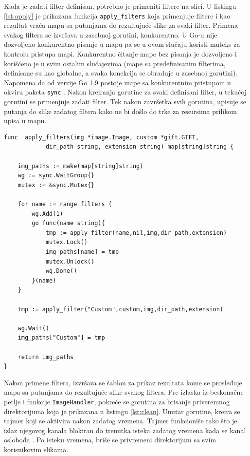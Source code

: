 \documentclass[12pt,oneside]{memoir}
\begin{document}
Kada je zadati filter definisan, potrebno je primeniti filtere na slici. U listingu \ref{lst:apply} je prikazana funkcija  \texttt{apply\_filters} koja primenjuje filtere i kao rezultat vraća mapu sa putanjama do rezultujuće slike za svaki filter. Primena svakog filtera se izvršava u zasebnoj gorutini, konkurentno. U Go-u nije dozvoljeno konkurentno pisanje u mapu pa se u ovom slučaju koristi muteks za kontrolu pristupa mapi. Konkurentno čitanje mape bez pisanja je dozvoljeno i korišćeno je u svim ostalim slučajevima (mape sa predefinisanim filterima, definisane su kao globalne, a svaka konekcija se obrađuje u zasebnoj gorutini). Napomena da od verzije Go 1.9 postoje mape sa konkurentnim pristupom u okviru paketa \texttt{sync} \cite{sync}. Nakon kreiranja gorutine za svaki definisani filter, u tekućoj gorutini se primenjuje zadati filter. Tek nakon završetka svih gorutina, upisuje se putanja do slike zadatog filtera kako ne bi došlo do trke za resursima prilikom upisa u mapu. 

\begin{center}
\begin{lstlisting}[caption=Funkcija za paralelnu primenu filtera,label={lst:apply},  backgroundcolor=\color{background}]
func  apply_filters(img *image.Image, custom *gift.GIFT, 
			dir_path string, extension string) map[string]string {

	img_paths := make(map[string]string)
	wg := sync.WaitGroup{}
	mutex := &sync.Mutex{}

	for name := range filters {
		wg.Add(1)
		go func(name string){
			tmp := apply_filter(name,nil,img,dir_path,extension)
			mutex.Lock()
			img_paths[name] = tmp
			mutex.Unlock()
			wg.Done()
		}(name)
	}

	tmp := apply_filter("Custom",custom,img,dir_path,extension)

	wg.Wait()
	img_paths["Custom"] = tmp

	return img_paths
}
\end{lstlisting}
\end{center}

Nakon primene filtera, izvršava se šablon za prikaz rezultata kome se prosleđuje mapa sa putanjama do rezultujuće slike svakog filtera. Pre izlaska iz beskonačne petlje i funkcije  \texttt{ImageHandler}, pokreće se gorutina za brisanje priveremnog direktorijuma koja je prikazana u listingu \ref{lst:clean}. Unutar gorutine, kreira se tajmer koji se aktivira nakon zadatog vremena. Tajmer funkcioniše tako što je izlaz njegovog kanala blokiran do trenutka isteka zadatog vremena kada se kanal oslobođa \cite{time}. Po isteku vremena, briše se privremeni direktorijum sa svim korisnikovim slikama. 
\end{document}
